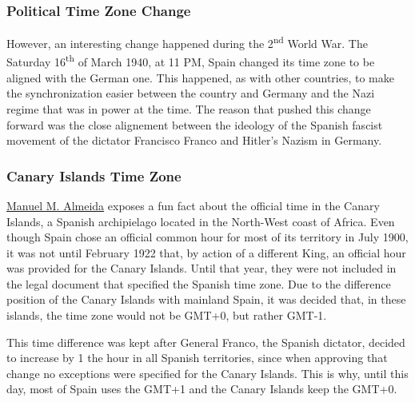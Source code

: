 \documentclass[../my_knowledge.tex]{subfiles}
\begin{document}
\subsubsection{Political Time Zone Change}
However, an interesting change happened during the 2\textsuperscript{nd} World War. The Saturday 16\textsuperscript{th} of March 1940\cite{spanish_timezone_change}, at 11 PM, Spain changed its time zone to be aligned with the German one. This happened, as with other countries, to make the synchronization easier between the country and Germany and the Nazi regime that was in power at the time. The reason that pushed this change forward was the close alignement between the ideology of the Spanish fascist movement of the dictator Francisco Franco and Hitler's Nazism in Germany.

\subsubsection{Canary Islands Time Zone}
\href{https://mangasverdes.es/2013/11/07/origen-hora-oficial-de-canarias/}{Manuel M. Almeida}\cite{canary_timezone} exposes a fun fact about the official time in the Canary Islands, a Spanish archipielago located in the North-West coast of Africa. Even though Spain chose an official common hour for most of its territory in July 1900, it was not until February 1922 that, by action of a different King, an official hour was provided for the Canary Islands. Until that year, they were not included in the legal document that specified the Spanish time zone. Due to the difference position of the Canary Islands with mainland Spain, it was decided that, in these islands, the time zone would not be GMT+0, but rather GMT-1.

This time difference was kept after General Franco, the Spanish dictator, decided to increase by 1 the hour in all Spanish territories, since when approving that change no exceptions were specified for the Canary Islands. This is why, until this day, most of Spain uses the GMT+1 and the Canary Islands keep the GMT+0.
\end{document}
